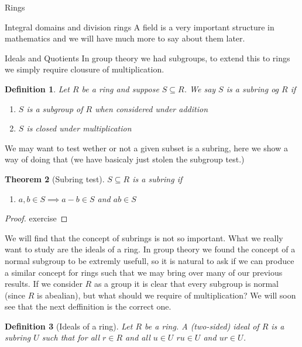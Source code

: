 \documentclass[11pt]{report}
\theoremstyle{break}
\newtheorem{thm}{Theorem}[section]
\newtheorem{defn}[thm]{Definition}
\begin{document}
\begin{chapter}{Rings}
\begin{section}{Integral domains and division rings}
A field is a very important structure in mathematics and we will have much more to say about them later. 

    
    \end{section}


\begin{section}{Ideals and Quotients}
    In group theory we had subgroups, to extend this to rings we simply require clousure of multiplication. 

    
    \begin{defn}
        Let $R$ be a ring and suppose $S \subseteq R$. We say $S$ is a subring og $R$ if 
        
        \begin{enumerate}
            \item $S$ is a subgroup of $R$ when considered under addition 
            \item $S$ is closed under multiplication
        \end{enumerate}
    \end{defn}

    We may want to test wether or not a given subset is a subring, here we show a way of doing that (we have basicaly just stolen the 
    subgroup test.)
    
    \begin{thm}[Subring test]
        $S \subseteq R$ is a subring if 
        
        \begin{enumerate}
            \item $a, b \in S \implies a - b \in S$ and $ab \in S$
        \end{enumerate}
        
    \end{thm}
    
    \begin{proof}
        exercise
    \end{proof}
    We will find that the concept of subrings is not so important. What we really want to study are the ideals of a ring. 
    In group theory we found the concept of a normal subgroup to be extremly usefull, so it is natural to ask if we can produce a similar concept for rings 
    such that we may bring over many of our previous results. If we consider $R$ as a group it is clear that every subgroup is normal (since 
    $R$ is abealian), but what should we require of multiplication? We will soon see that the next deffinition is the correct one. 

    
    \begin{defn}[Ideals of a ring]
        Let $R$ be a ring. A (two-sided) ideal of $R$ is a subring $U$ such that for all $r \in R$ and all $u \in U$ 
        $ru \in U$ and $ur \in U$.  
    \end{defn}


\end{section}
\end{chapter}
\end{document}
